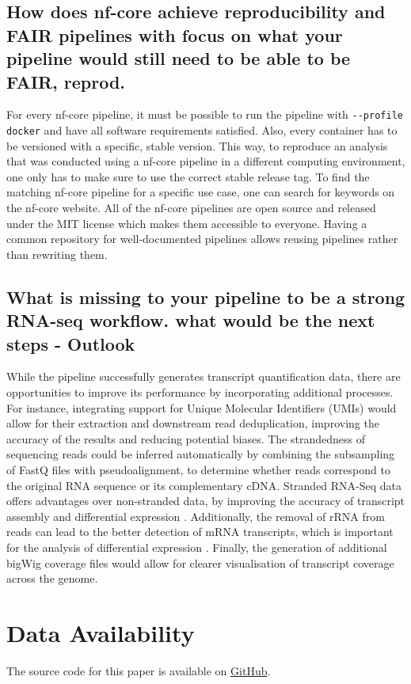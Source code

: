 \documentclass{article}
\theoremstyle{plain}
\theoremstyle{definition}
\theoremstyle{remark}
\begin{document}
\subsection{How does nf-core achieve reproducibility and FAIR pipelines with focus on what your pipeline would still need to be able to be FAIR, reprod.}
For every nf-core pipeline, it must be possible to run the pipeline with \verb|--profile docker| and have all software requirements satisfied. Also, every container has to be versioned with a specific, stable version. This way, to reproduce an analysis that was conducted using a nf-core pipeline in a different computing environment, one only has to make sure to use the correct stable release tag. To find the matching nf-core pipeline for a specific use case, one can search for keywords on the nf-core website. All of the nf-core pipelines are open source and released under the MIT license which makes them accessible to everyone. Having a common repository for well-documented pipelines allows reusing pipelines rather than rewriting them.
\subsection{What is missing to your pipeline to be a strong RNA-seq workflow. what would be the next steps - Outlook}
While the pipeline successfully generates transcript quantification data, there are opportunities to improve its performance by incorporating additional processes. For instance, integrating support for Unique Molecular Identifiers (UMIs) would allow for their extraction and downstream read deduplication, improving the accuracy of the results and reducing potential biases. The strandedness of sequencing reads could be inferred automatically by combining the subsampling of FastQ files with pseudoalignment, to determine whether reads correspond to the original RNA sequence or its complementary cDNA. Stranded RNA-Seq data offers advantages over non-stranded data, by improving the accuracy of transcript assembly and differential expression \cite{Signal2022}. Additionally, the removal of rRNA from reads can lead to the better detection of mRNA transcripts, which is important for the analysis of differential expression \cite{Pastor2022}. Finally, the generation of additional bigWig coverage files would allow for clearer visualisation of transcript coverage across the genome.

\section*{Data Availability}
The source code for this paper is available on \href{{https://github.com/JuliaGraf/RNAseq}}{GitHub}.



\end{document}
